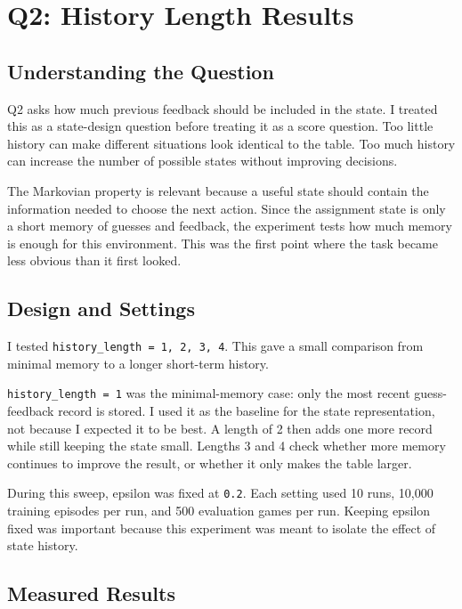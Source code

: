 \documentclass[11pt,a4paper]{article}
\begin{document}
\section{Q2: History Length Results}

\subsection{Understanding the Question}

Q2 asks how much previous feedback should be included in the state. I treated this as a state-design question before treating it as a score question. Too little history can make different situations look identical to the table. Too much history can increase the number of possible states without improving decisions.

The Markovian property is relevant because a useful state should contain the information needed to choose the next action. Since the assignment state is only a short memory of guesses and feedback, the experiment tests how much memory is enough for this environment. This was the first point where the task became less obvious than it first looked.

\subsection{Design and Settings}

I tested \texttt{history\_length = 1, 2, 3, 4}. This gave a small comparison from minimal memory to a longer short-term history.

\texttt{history\_length = 1} was the minimal-memory case: only the most recent guess-feedback record is stored. I used it as the baseline for the state representation, not because I expected it to be best. A length of 2 then adds one more record while still keeping the state small. Lengths 3 and 4 check whether more memory continues to improve the result, or whether it only makes the table larger.

During this sweep, epsilon was fixed at \texttt{0.2}. Each setting used 10 runs, 10{,}000 training episodes per run, and 500 evaluation games per run. Keeping epsilon fixed was important because this experiment was meant to isolate the effect of state history.

\subsection{Measured Results}
\end{document}
